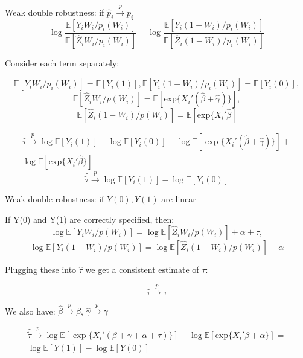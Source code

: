 \documentclass[a4paper,12pt]{article}
\theoremstyle{plain}
\begin{document}
Weak double robustness: if $\hat p_i \stackrel{p}{\to} p_i$
$$\log\frac{\mathbb{E}[Y_i W_i / p_i(W_i)]}{\mathbb{E}[\hat Z_i W_i / p_i(W_i)]} - \log \frac{\mathbb{E}[Y_i (1 - W_i) / p_i(W_i)]}{\mathbb{E}[\hat Z_i (1 - W_i) / p_i(W_i)]}$$

Consider each term separately:

$$\mathbb{E}[Y_i W_i / p_i(W_i)] = \mathbb{E}[Y_i(1)], \mathbb{E}[Y_i (1 - W_i) / p_i(W_i)] = \mathbb{E}[Y_i(0)],$$
$$\mathbb{E}[\hat Z_iW_i / p(W_i)] = \mathbb{E}[\mathrm{exp}\{X_i'(\hat \beta + \hat \gamma)\}],$$
$$\mathbb{E}[\hat Z_i(1 - W_i) / p(W_i)] = \mathbb{E}[\mathrm{exp}\{X_i'\hat \beta]$$

\begin{gather*}
  \hat{\tau} \stackrel{p}{\to} \log \mathbb{E}[Y_i(1)] - \log \mathbb{E}[Y_i(0)] - \log \mathbb{E}[\exp\{X_i'(\hat \beta + \hat \gamma)\}] + \\
  \log \mathbb{E}[\mathrm{exp}\{X_i'\hat \beta\}]  
\end{gather*}
$$\hat{\tilde{\tau}} \stackrel{p}{\to} \log \mathbb{E}[Y_i(1)] - \log \mathbb{E}[Y_i(0)]$$

Weak double robustness: if $Y(0), Y(1)$ are linear

If Y(0) and Y(1) are correctly specified, then:
$$\log \mathbb{E}[Y_iW_i / p(W_i)] =  \log \mathbb{E}[\hat Z_i W_i / p(W_i)] + \alpha + \tau,$$
$$\log \mathbb{E}[Y_i(1 - W_i) / p(W_i)] = \log \mathbb{E}[\hat Z_i (1 - W_i) / p(W_i)] + \alpha$$

Plugging these into $\hat \tau$ we get a consistent estimate of $\tau$:

$$\hat{\tau} \stackrel{p}{\to} \tau$$

We also have: $\hat{\beta} \stackrel{p}{\to} \beta$, $\hat{\gamma} \stackrel{p}{\to} \gamma$

\begin{gather*}
    \hat{\tilde{\tau}} \stackrel{p}{\to} \log \mathbb{E}[\exp\{X_i'(\beta + \gamma + \alpha + \tau)\}] - \log \mathbb{E}[\mathrm{exp}\{X_i'\beta + \alpha\}] = \\
    \log \mathbb{E}[Y(1)] - \log \mathbb{E}[Y(0)]
\end{gather*}
\end{document}
